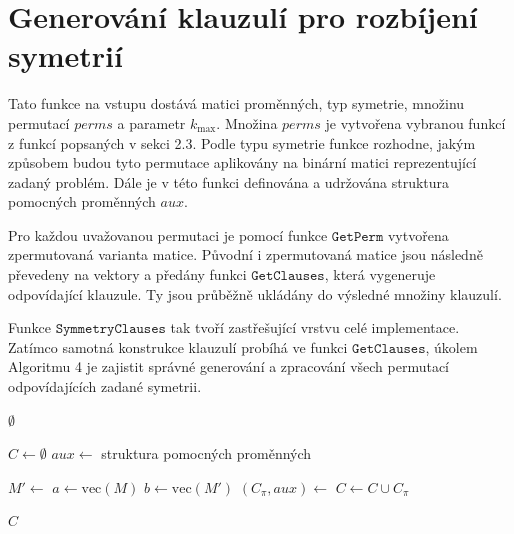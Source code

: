 \section{Generování klauzulí pro rozbíjení symetrií}
Tato funkce na vstupu dostává matici proměnných, typ symetrie, množinu permutací $perms$ a parametr $k_{\max}$. Množina $perms$ je vytvořena vybranou funkcí z funkcí popsaných v sekci 2.3. Podle typu symetrie funkce rozhodne, jakým způsobem budou tyto permutace aplikovány na binární matici reprezentující zadaný problém. Dále je v této funkci definována a udržována struktura pomocných proměnných $aux$.

Pro každou uvažovanou permutaci je pomocí funkce $\texttt{GetPerm}$ vytvořena zpermutovaná varianta matice. Původní i zpermutovaná matice jsou následně převedeny na vektory a předány funkci $\texttt{GetClauses}$, která vygeneruje odpovídající klauzule. Ty jsou průběžně ukládány do výsledné množiny klauzulí.

Funkce $\texttt{SymmetryClauses}$ tak tvoří zastřešující vrstvu celé implementace. Zatímco samotná konstrukce klauzulí probíhá ve funkci $\texttt{GetClauses}$, úkolem Algoritmu 4 je zajistit správné generování a zpracování všech permutací odpovídajících zadané symetrii.

\begin{algorithm}[H]
\caption{Generování klauzulí pro rozbíjení symetrií}
\begin{algorithmic}[1]
\State \Return $\emptyset$
\EndIf

\State $C\gets\emptyset$
\State $aux\gets$ struktura pomocných proměnných

    	\State $M' \gets $
    	\State $a\gets \text{vec}(M)$
    	\State $b\gets \text{vec}(M')$
    	\State $(C_\pi,aux)\gets$
    	\State $C\gets C\cup C_\pi$
\EndFor

\State \Return $C$

\EndFunction
\end{algorithmic}
\end{algorithm}
